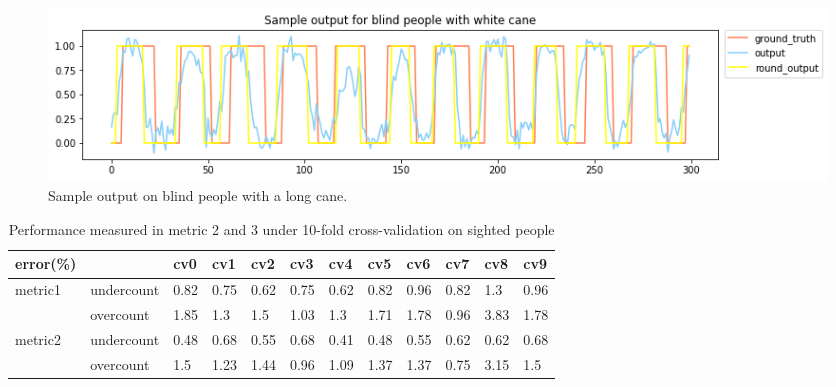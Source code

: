 \documentclass[11pt]{article}
\begin{document}
{\begin{figure}[ht]
\centering
\includegraphics[scale=0.5]{output_wc_2}
\caption{Sample output on blind people with a long cane.}
\label{fig:output_wc_2}
\end{figure}




\begin{table}[]
\centering
\caption{Performance measured in metric 2 and 3 under 10-fold cross-validation on sighted people}
\label{label_metric23_sighted}
\begin{tabular}{llllllllllll}
\hline
error(\%)                &            & cv0   & cv1   & cv2   & cv3   & cv4   & cv5   & cv6   & cv7   & cv8   & cv9  \\ \hline
metric1                  & undercount & 0.82  & 0.75  & 0.62  & 0.75  & 0.62  & 0.82  & 0.96  & 0.82  & 1.3   & 0.96 \\
                         & overcount  & 1.85  & 1.3   & 1.5   & 1.03  & 1.3   & 1.71  & 1.78  & 0.96  & 3.83  & 1.78 \\ \hline
\multirow{2}{*}{metric2} & undercount & 0.48  & 0.68  & 0.55  & 0.68  & 0.41  & 0.48  & 0.55  & 0.62  & 0.62  & 0.68 \\
                         & overcount  & 1.5   & 1.23  & 1.44  & 0.96  & 1.09  & 1.37  & 1.37  & 0.75  & 3.15  & 1.5  \\ \hline
\end{tabular}
\end{table}


}
\end{document}
